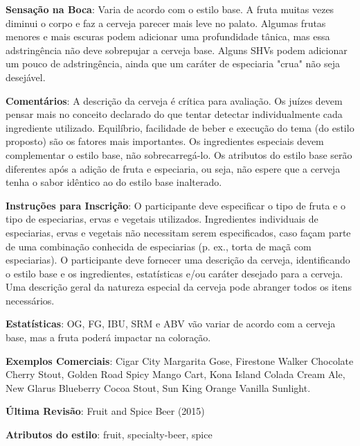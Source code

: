 \textbf{Sensação na Boca}: Varia de acordo com o estilo base. A fruta muitas vezes diminui o corpo e faz a cerveja parecer mais leve no palato. Algumas frutas menores e mais escuras podem adicionar uma profundidade tânica, mas essa adstringência não deve sobrepujar a cerveja base. Alguns SHVs podem adicionar um pouco de adstringência, ainda que um caráter de especiaria "crua" não seja desejável.

\textbf{Comentários}: A descrição da cerveja é crítica para avaliação. Os juízes devem pensar mais no conceito declarado do que tentar detectar individualmente cada ingrediente utilizado. Equilíbrio, facilidade de beber e execução do tema (do estilo proposto) são os fatores mais importantes. Os ingredientes especiais devem complementar o estilo base, não sobrecarregá-lo. Os atributos do estilo base serão diferentes após a adição de fruta e especiaria, ou seja, não espere que a cerveja tenha o sabor idêntico ao do estilo base inalterado.

\textbf{Instruções para Inscrição}: O participante deve especificar o tipo de fruta e o tipo de especiarias, ervas e vegetais utilizados. Ingredientes individuais de especiarias, ervas e vegetais não necessitam serem especificados, caso façam parte de uma combinação conhecida de especiarias (p. ex., torta de maçã com especiarias). O participante deve fornecer uma descrição da cerveja, identificando o estilo base e os ingredientes, estatísticas e/ou caráter desejado para a cerveja. Uma descrição geral da natureza especial da cerveja pode abranger todos os itens necessários.

\textbf{Estatísticas}: OG, FG, IBU, SRM e ABV vão variar de acordo com a cerveja base, mas a fruta poderá impactar na coloração.

\textbf{Exemplos Comerciais}: Cigar City Margarita Gose, Firestone Walker Chocolate Cherry Stout, Golden Road Spicy Mango Cart, Kona Island Colada Cream Ale, New Glarus Blueberry Cocoa Stout, Sun King Orange Vanilla Sunlight.

\textbf{Última Revisão}: Fruit and Spice Beer (2015)

\textbf{Atributos do estilo}: fruit, specialty-beer, spice
